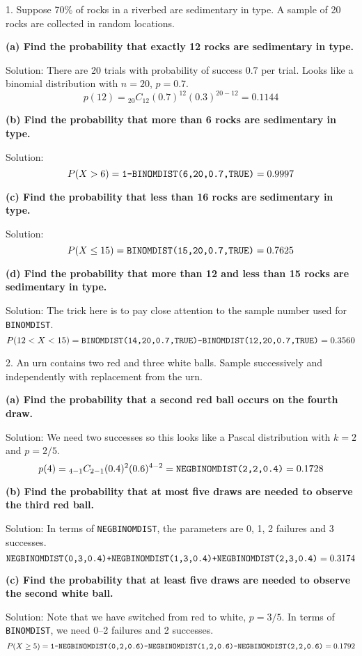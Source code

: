 1. Suppose 70\% of rocks in a riverbed are sedimentary in type.
A sample of 20 rocks are collected in random locations.

\bigskip
{\bf (a) Find the probability that exactly 12 rocks are
sedimentary in type.}

\bigskip
Solution: There are 20 trials with probability
of success 0.7 per trial.
Looks like a binomial distribution with $n=20$, $p=0.7$.
$$p(12)={}_{20}C_{12}(0.7)^{12}(0.3)^{20-12}=0.1144$$

\bigskip
{\bf (b) Find the probability that more than 6 rocks
are sedimentary in type.}

\bigskip
Solution:
$$P(X>6)=\hbox{\tt 1-BINOMDIST(6,20,0.7,TRUE)}=0.9997$$

\bigskip
{\bf (c) Find the probability that less than 16 rocks
are sedimentary in type.}

\bigskip
Solution:
$$P(X\le15)=\hbox{\tt BINOMDIST(15,20,0.7,TRUE)}=0.7625$$

\bigskip
{\bf (d) Find the probability that more than 12 and less
than 15 rocks are sedimentary in type.}

\bigskip
Solution: The trick here is to pay close attention to the sample number
used for {\tt BINOMDIST}.
$$P(12<X<15)=\hbox{\tt BINOMDIST(14,20,0.7,TRUE)-BINOMDIST(12,20,0.7,TRUE)}=0.3560$$

\vfill
\eject

2. An urn contains two red and three white balls.
Sample successively and independently with replacement from the urn.

\bigskip
{\bf (a) Find the probability that a second red ball occurs on the fourth draw.}

\bigskip
Solution: We need two successes so this looks like a Pascal distribution with $k=2$
and $p=2/5$.
$$p(4)={}_{4-1}C_{2-1}(0.4)^2(0.6)^{4-2}
=\hbox{\tt NEGBINOMDIST(2,2,0.4)}=0.1728$$

\bigskip
{\bf (b) Find the probability that at most five draws are needed to observe
the third red ball.}

\bigskip
Solution: In terms of {\tt NEGBINOMDIST}, the parameters are 0, 1, 2 failures
and 3 successes.
$$\hbox{\tt NEGBINOMDIST(0,3,0.4)+NEGBINOMDIST(1,3,0.4)+NEGBINOMDIST(2,3,0.4)}=0.3174$$

\bigskip
{\bf (c) Find the probability that at least five draws are needed to observe
the second white ball.}

\bigskip
Solution: Note that we have switched from red to white, $p=3/5$.
In terms of {\tt BINOMDIST}, we need 0--2 failures and 2 successes.
$$P(X\ge5)=
\hbox{\tt 1-NEGBINOMDIST(0,2,0.6)-NEGBINOMDIST(1,2,0.6)-NEGBINOMDIST(2,2,0.6)}
=0.1792$$

